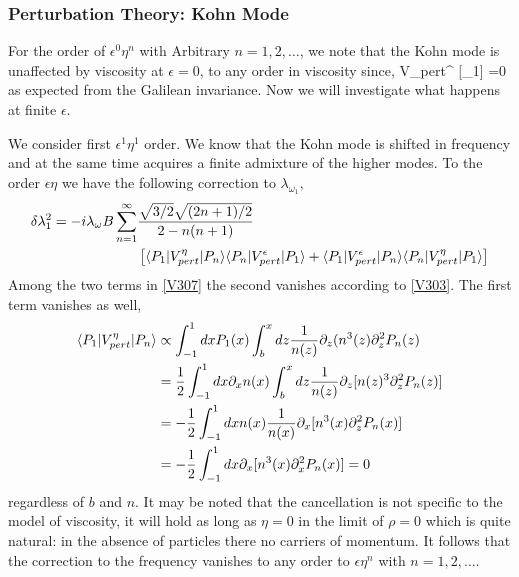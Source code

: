 \subsubsection{Perturbation Theory: Kohn Mode
}
For the order of $ \epsilon^0 \eta^n$ with Arbitrary $n=1,2,\ldots$, we note that the Kohn mode is unaffected by viscosity at $\epsilon=0$, to any order in viscosity since,
\be\label{V303}
V_{pert}^{\eta} [\chi_1] =0
\ee
as expected from the Galilean invariance. Now we will investigate what happens at finite $\epsilon$.


We consider first $\epsilon^1 \eta^1$ order.
We know that the Kohn mode is shifted in frequency and at the same time acquires a finite admixture of the higher modes.
To the order $\epsilon \eta$ we have the following correction to $\lambda_{\omega_1}$,
\begin{align}
\label{V307}
\delta \lambda^2_1 = - i \lambda_{\omega} B  \sum_{n=1}^{\infty}& 
\frac{\sqrt{ 3/2 }\sqrt{(2 n +1)/2}}{2 - n(n+1)} \notag \\
&\left[
\langle P_1| V_{pert}^{\eta} | P_n\rangle \langle P_n| V_{pert}^{\epsilon} | P_1 \rangle
+
\langle P_1| V_{pert}^{\epsilon} | P_n\rangle \langle P_n| V_{pert}^{\eta} | P_1 \rangle \right]
\end{align}
Among the two terms in \eqref{V307} the second vanishes according to \eqref{V303}.
The first term vanishes as well,
\begin{align}
\langle P_1| V_{pert}^{\eta} | P_n\rangle & \propto
\int_{-1}^{1} d x P_1(x) \int_{b}^x d z \frac{1}{n(z)} \partial_z(n^3(z) \partial^2_z P_n(z)
\notag \\
&=\frac{1}{2} \int_{-1}^{1} d x \partial_x n(x) \int_{b}^x d z \frac{1}{n(z)} \partial_z [n(z)^3 \partial^2_z P_n(z)]
\notag \\
&=
-\frac{1}{2} \int_{-1}^{1} d x n(x)  \frac{1}{n(x)} \partial_x [n^3(x) \partial^2_z P_n(x)]
\notag \\
&=
-\frac{1}{2} \int_{-1}^{1} d x  \partial_x [n^3(x) \partial^2_x P_n(x)]
=0
\end{align}
regardless of $b$ and $n$.
It may be noted that the cancellation is not specific to the model of viscosity, it will hold as long as $\eta=0$ in the limit of $\rho =0$ which is quite natural: in the absence of particles there no carriers of momentum.
It follows that the correction to the frequency vanishes to any order to $\epsilon \eta^n$ with $n=1,2,\ldots$.



